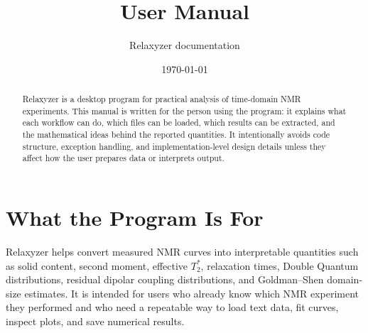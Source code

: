 \documentclass[11pt,a4paper]{article}
\title{\Relaxyzer{} User Manual}
\author{Relaxyzer documentation}
\date{\today}
\newcommand{\Relaxyzer}{Relaxyzer}
\newcommand{\TtwoStar}{\ensuremath{T_2^{\ast}}}
\begin{document}
\maketitle

\begin{abstract}
\Relaxyzer{} is a desktop program for practical analysis of time-domain NMR experiments. This manual is written for the person using the program: it explains what each workflow can do, which files can be loaded, which results can be extracted, and the mathematical ideas behind the reported quantities. It intentionally avoids code structure, exception handling, and implementation-level design details unless they affect how the user prepares data or interprets output.
\end{abstract}

\tableofcontents
\newpage

\section{What the Program Is For}

\Relaxyzer{} helps convert measured NMR curves into interpretable quantities such as solid content, second moment, effective \TtwoStar{}, relaxation times, Double Quantum distributions, residual dipolar coupling distributions, and Goldman--Shen domain-size estimates. It is intended for users who already know which NMR experiment they performed and who need a repeatable way to load text data, fit curves, inspect plots, and save numerical results.
\end{document}
